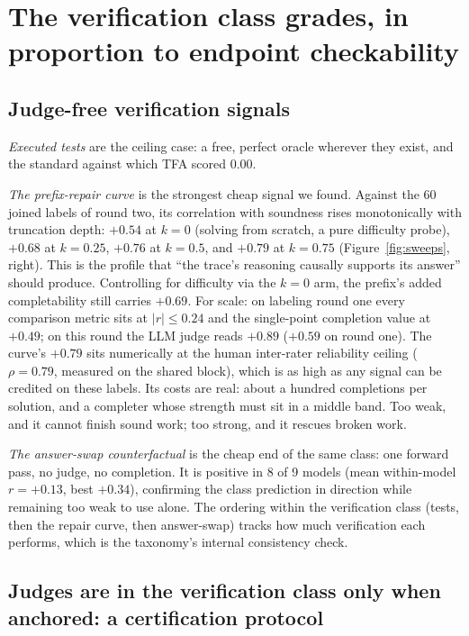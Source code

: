 \documentclass[11pt]{article}
\newcommand{\tfa}{\textsc{TFA}}
\begin{document}
\section{The verification class grades, in proportion to endpoint checkability}
\label{sec:verify}

\subsection{Judge-free verification signals}

\emph{Executed tests} are the ceiling case: a free, perfect oracle wherever they exist, and the standard against which \tfa{} scored $0.00$.

\emph{The prefix-repair curve} is the strongest cheap signal we found.
Against the 60 joined labels of round two, its correlation with soundness rises monotonically with truncation depth: $+0.54$ at $k{=}0$ (solving from scratch, a pure difficulty probe), $+0.68$ at $k{=}0.25$, $+0.76$ at $k{=}0.5$, and $+0.79$ at $k{=}0.75$ (Figure~\ref{fig:sweeps}, right).
This is the profile that ``the trace's reasoning causally supports its answer'' should produce.
Controlling for difficulty via the $k{=}0$ arm, the prefix's added completability still carries $+0.69$.
For scale: on labeling round one every comparison metric sits at $|r| \le 0.24$ and the single-point completion value at $+0.49$; on this round the LLM judge reads $+0.89$ ($+0.59$ on round one).
The curve's $+0.79$ sits numerically at the human inter-rater reliability ceiling ($\rho = 0.79$, measured on the shared block), which is as high as any signal can be credited on these labels.
Its costs are real: about a hundred completions per solution, and a completer whose strength must sit in a middle band.
Too weak, and it cannot finish sound work; too strong, and it rescues broken work.

\emph{The answer-swap counterfactual} is the cheap end of the same class: one forward pass, no judge, no completion.
It is positive in 8 of 9 models (mean within-model $r = +0.13$, best $+0.34$), confirming the class prediction in direction while remaining too weak to use alone.
The ordering within the verification class (tests, then the repair curve, then answer-swap) tracks how much verification each performs, which is the taxonomy's internal consistency check.

\subsection{Judges are in the verification class only when anchored: a certification protocol}
\label{sec:certify}
\end{document}

